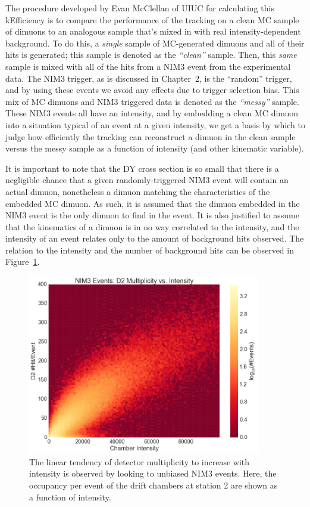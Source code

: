 The procedure developed by Evan McClellan of UIUC for calculating this kEfficiency is to compare the performance of the tracking on a clean MC sample of dimuons to an analogous sample that's mixed in with real intensity-dependent background. To do this, a \emph{single} sample of MC-generated dimuons and all of their hits is generated; this sample is denoted as the \emph{``clean''} sample. Then, this \emph{same} sample is mixed with all of the hits from a NIM3 event from the experimental data. The NIM3 trigger, as is discussed in Chapter~2, is the ``random'' trigger, and by using these events we avoid any effects due to trigger selection bias. This mix of MC dimuons and NIM3 triggered data is denoted as the \emph{``messy''} sample. These NIM3 events all have an intensity, and by embedding a clean MC dimuon into a situation typical of an event at a given intensity, we get a basis by which to judge how efficiently the tracking can reconstruct a dimuon in the clean sample versus the messy sample as a function of intensity (and other kinematic variable).

It is important to note that the DY cross section is so small that there is a negligible chance that a given randomly-triggered NIM3 event will contain an actual dimuon, nonetheless a dimuon matching the characteristics of the embedded MC dimuon. As such, it is assumed that the dimuon embedded in the NIM3 event is the only dimuon to find in the event. It is also justified to assume that the kinematics of a dimuon is in no way correlated to the intensity, and the intensity of an event relates only to the amount of background hits observed. The relation to the intensity and the number of background hits can be observed in Figure~\ref{fig:NIM3-Int-Mult}.

\begin{figure}
	\centering
	\includegraphics[width=4in]{figures/analysis/NIM3-Int-Mult.png}
	\caption{The linear tendency of detector multiplicity to increase with intensity is observed by looking to unbiased NIM3 events. Here, the occupancy per event of the drift chambers at station 2 are shown as a function of intensity.}
	\label{fig:NIM3-Int-Mult}
\end{figure}

